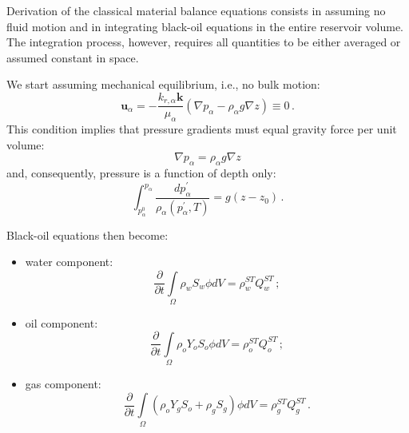 \documentclass[authoryear,preprint,review,12pt]{elsarticle}
\begin{document}
Derivation of the classical material balance equations consists in assuming no fluid motion and in integrating black-oil equations in the entire reservoir volume. The integration process, however, requires all quantities to be either averaged or assumed constant in space.




We start assuming mechanical equilibrium, i.e., no bulk motion:
\begin{equation}
\mathbf{u}_\alpha = -\frac{k_{r,\alpha} \mathbf{k}}{\mu_\alpha} \left(\nabla p_\alpha - \rho_\alpha g\nabla z\right)\equiv 0 \, .
\end{equation}
This condition implies that pressure gradients must equal gravity force per unit volume:
\begin{equation}\label{eq: p=rhogh}
\nabla p_\alpha = \rho_\alpha g\nabla z
\end{equation}
and, consequently, pressure is a function of depth only:
\begin{equation}\label{eq: p=rhogh}
\int_{p_\alpha^0}^{p_\alpha} \frac{dp_\alpha^{'}}{\rho_\alpha \left(p_\alpha^{'},T\right)} = g\left(z - z_0\right) \, .
\end{equation}

Black-oil equations then become:
\begin{itemize}
\item water component:
\begin{equation}\label{eq: Sw2}
\frac{\partial}{\partial t} \int\limits_{\Omega} \rho_w S_w \phi dV = \rho_w^{ST}Q_w^{ST} \, ;
\end{equation}

\item oil component:
\begin{equation}\label{eq: So2}
\frac{\partial}{\partial t} \int\limits_{\Omega} \rho_o Y_o S_o \phi dV = \rho_o^{ST}Q_o^{ST} \, ;
\end{equation}

\item gas component:
\begin{equation}\label{eq: Sg2}
\frac{\partial}{\partial t} \int\limits_{\Omega} \left( \rho_o Y_g S_o + \rho_g S_g\right) \phi dV = \rho_g^{ST}Q_g^{ST} \, .
\end{equation}
\end{itemize}
%
\end{document}
